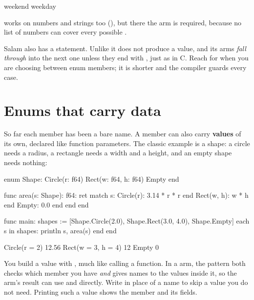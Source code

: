 \begin{progout}
weekend weekday
\end{progout}

 works on numbers and strings too (), but there the  arm is required, because no
list of numbers can cover every possible .

\begin{note}
Salam also has a  statement. Unlike  it does not produce
a value, and its arms \emph{fall through} into the next one unless they end with
, just as in C. Reach for  when you are choosing between
enum members; it is shorter and the compiler guards every case.
\end{note}

\section{Enums that carry data}

So far each member has been a bare name. A member can also carry
\textbf{values} of its own, declared like function parameters. The classic
example is a shape: a circle needs a radius, a rectangle needs a width and a
height, and an empty shape needs nothing:

\begin{salamen}
enum Shape:
    Circle(r: f64)
    Rect(w: f64, h: f64)
    Empty
end

func area(s: Shape): f64:
    ret match s:
        Circle(r): 3.14 * r * r end
        Rect(w, h): w * h end
        Empty: 0.0 end
    end
end

func main:
    shapes := [Shape.Circle(2.0), Shape.Rect(3.0, 4.0), Shape.Empty]
    each s in shapes:
        println s, area(s)
    end
end
\end{salamen}

\begin{progout}
Circle(r = 2) 12.56
Rect(w = 3, h = 4) 12
Empty 0
\end{progout}

You build a value with , much like calling a function.
In a  arm, the pattern  both checks which member you
have \emph{and} gives names to the values inside it, so the arm's result can use
 and  directly. Write \code{\_} in place of a name to skip a value
you do not need. Printing such a value shows the member and its fields.

